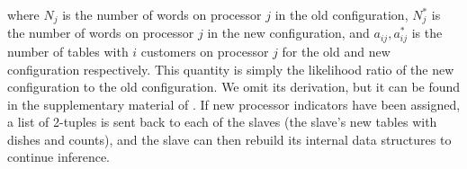 where $N_j$ is the number of words on processor $j$ in the old
configuration, $N_j^*$ is the number of words on processor $j$ in the
new configuration, and $a_{ij}, a_{ij}^*$ is the number of tables with
$i$ customers on processor $j$ for the old and new configuration
respectively. This quantity is simply the likelihood ratio of the new
configuration to the old configuration. We omit its derivation, but it
can be found in the supplementary material of
\cite{williamson2013}. If new processor indicators have been assigned,
a list of 2-tuples is sent back to each of the slaves (the slave's new
tables with dishes and counts), and the slave can then rebuild its
internal data structures to continue inference.
